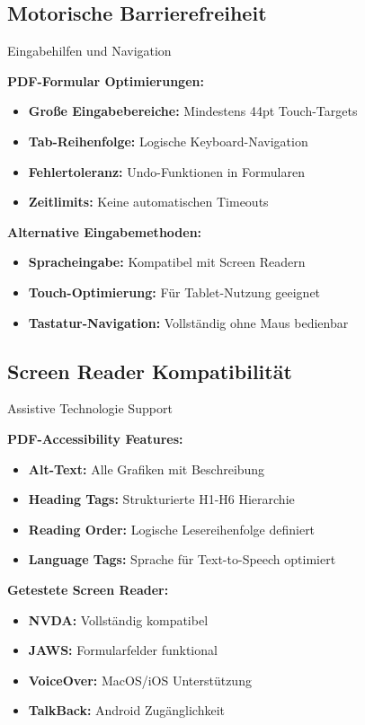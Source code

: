 \subsection{Motorische Barrierefreiheit}

\begin{ctmmPurpleBox}{Eingabehilfen und Navigation}

\textbf{PDF-Formular Optimierungen:}
\begin{itemize}
  \item \textbf{Große Eingabebereiche:} Mindestens 44pt Touch-Targets
  \item \textbf{Tab-Reihenfolge:} Logische Keyboard-Navigation
  \item \textbf{Fehlertoleranz:} Undo-Funktionen in Formularen
  \item \textbf{Zeitlimits:} Keine automatischen Timeouts
\end{itemize}

\textbf{Alternative Eingabemethoden:}
\begin{itemize}
  \item \textbf{Spracheingabe:} Kompatibel mit Screen Readern
  \item \textbf{Touch-Optimierung:} Für Tablet-Nutzung geeignet
  \item \textbf{Tastatur-Navigation:} Vollständig ohne Maus bedienbar
\end{itemize}

\end{ctmmPurpleBox}

\subsection{Screen Reader Kompatibilität}

\begin{ctmmBlueBox}{Assistive Technologie Support}

\textbf{PDF-Accessibility Features:}
\begin{itemize}
  \item \textbf{Alt-Text:} Alle Grafiken mit Beschreibung
  \item \textbf{Heading Tags:} Strukturierte H1-H6 Hierarchie
  \item \textbf{Reading Order:} Logische Lesereihenfolge definiert
  \item \textbf{Language Tags:} Sprache für Text-to-Speech optimiert
\end{itemize}

\textbf{Getestete Screen Reader:}
\begin{itemize}
  \item \textbf{NVDA:} Vollständig kompatibel
  \item \textbf{JAWS:} Formularfelder funktional
  \item \textbf{VoiceOver:} MacOS/iOS Unterstützung
  \item \textbf{TalkBack:} Android Zugänglichkeit
\end{itemize}

\end{ctmmBlueBox}

